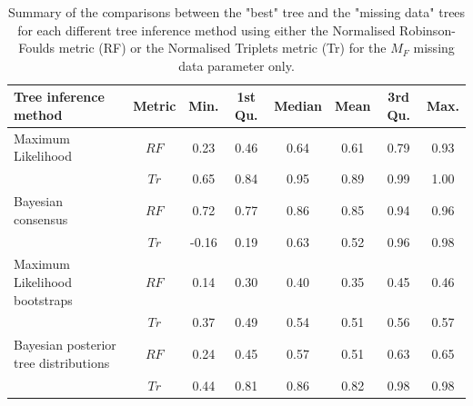 \documentclass[12pt,letterpaper]{article}
\begin{document}
\begin{landscape}
\begin{table}[ht]
\caption{Summary of the comparisons between the "best" tree and the "missing data" trees for each different tree inference method using either the Normalised Robinson-Foulds metric (RF) or the Normalised Triplets metric (Tr) for the $M_{F}$ missing data parameter only.}
\label{Tab_Supp_summary_metric_MF}
\centering
\begin{tabular}{lccccccc}
  \hline
 Tree inference method & Metric & Min. & 1st Qu. & Median & Mean & 3rd Qu. & Max. \\ 
  \hline
  Maximum Likelihood                    & $RF$ & 0.23 & 0.46 & 0.64 & 0.61 & 0.79 & 0.93 \\ 
                                        & $Tr$ & 0.65 & 0.84 & 0.95 & 0.89 & 0.99 & 1.00 \\ 
  Bayesian consensus                    & $RF$ & 0.72 & 0.77 & 0.86 & 0.85 & 0.94 & 0.96 \\ 
                                        & $Tr$ & -0.16 & 0.19 & 0.63 & 0.52 & 0.96 & 0.98 \\ 
  Maximum Likelihood bootstraps         & $RF$ & 0.14 & 0.30 & 0.40 & 0.35 & 0.45 & 0.46 \\ 
                                        & $Tr$ & 0.37 & 0.49 & 0.54 & 0.51 & 0.56 & 0.57 \\ 
  Bayesian posterior tree distributions & $RF$ & 0.24 & 0.45 & 0.57 & 0.51 & 0.63 & 0.65 \\ 
                                        & $Tr$ & 0.44 & 0.81 & 0.86 & 0.82 & 0.98 & 0.98 \\ 
   \hline
\end{tabular}
\end{table}
\end{landscape}
\end{document}
